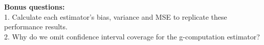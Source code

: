 \documentclass{exam}
\begin{document}
\noindent\textbf{Bonus questions:} \\
1. Calculate each estimator's bias, variance and MSE to replicate these performance results. \\
2. Why do we omit confidence interval coverage for the g-computation estimator? \\
\end{document}
